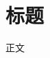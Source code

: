 \documentclass{article}
\theoremstyle{plain} \newtheorem{theorem}{定理}[section]
\theoremstyle{plain} \newtheorem{definition}{定义}[section]
\theoremstyle{plain} \newtheorem{lemma}{引理}[section]
\theoremstyle{plain} \newtheorem{Proposition}{命题}[section]
\theoremstyle{plain} \newtheorem{Corollary}{推论}[section]
\theoremstyle{plain} \newtheorem{example}{例}
\begin{document}
	\pagestyle{empty}
	\title{}
	\author{}
    \date{}
	\maketitle

\section*{标题}

正文
\end{document}
